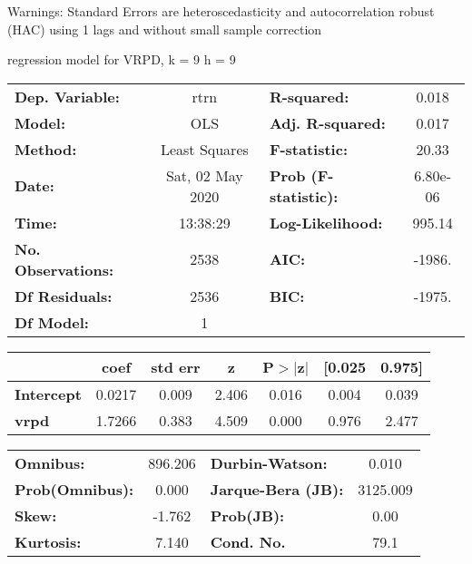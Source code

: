 Warnings: \newline
 [1] Standard Errors are heteroscedasticity and autocorrelation robust (HAC) using 1 lags and without small sample correction\ 

regression model for VRPD, k = 9 h = 9\begin{center}
\begin{tabular}{lclc}
\toprule
\textbf{Dep. Variable:}    &       rtrn       & \textbf{  R-squared:         } &     0.018   \\
\textbf{Model:}            &       OLS        & \textbf{  Adj. R-squared:    } &     0.017   \\
\textbf{Method:}           &  Least Squares   & \textbf{  F-statistic:       } &     20.33   \\
\textbf{Date:}             & Sat, 02 May 2020 & \textbf{  Prob (F-statistic):} &  6.80e-06   \\
\textbf{Time:}             &     13:38:29     & \textbf{  Log-Likelihood:    } &    995.14   \\
\textbf{No. Observations:} &        2538      & \textbf{  AIC:               } &    -1986.   \\
\textbf{Df Residuals:}     &        2536      & \textbf{  BIC:               } &    -1975.   \\
\textbf{Df Model:}         &           1      & \textbf{                     } &             \\
\bottomrule
\end{tabular}
\begin{tabular}{lcccccc}
                   & \textbf{coef} & \textbf{std err} & \textbf{z} & \textbf{P$> |$z$|$} & \textbf{[0.025} & \textbf{0.975]}  \\
\midrule
\textbf{Intercept} &       0.0217  &        0.009     &     2.406  &         0.016        &        0.004    &        0.039     \\
\textbf{vrpd}      &       1.7266  &        0.383     &     4.509  &         0.000        &        0.976    &        2.477     \\
\bottomrule
\end{tabular}
\begin{tabular}{lclc}
\textbf{Omnibus:}       & 896.206 & \textbf{  Durbin-Watson:     } &    0.010  \\
\textbf{Prob(Omnibus):} &   0.000 & \textbf{  Jarque-Bera (JB):  } & 3125.009  \\
\textbf{Skew:}          &  -1.762 & \textbf{  Prob(JB):          } &     0.00  \\
\textbf{Kurtosis:}      &   7.140 & \textbf{  Cond. No.          } &     79.1  \\
\bottomrule
\end{tabular}
\end{center}

